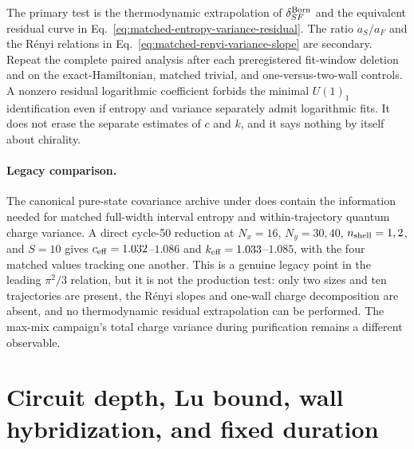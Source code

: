 \documentclass[aps,prx,twocolumn,floatfix,nofootinbib,superscriptaddress,longbibliography]{revtex4-2}
\begin{document}
The primary test is the thermodynamic extrapolation of $\delta_{SF}^{\rm Born}$ and the
equivalent residual curve in Eq.~\eqref{eq:matched-entropy-variance-residual}.  The ratio
$a_S/a_F$ and the R\'enyi relations in Eq.~\eqref{eq:matched-renyi-variance-slope} are
secondary.  Repeat the complete paired analysis after each preregistered fit-window
deletion and on the exact-Hamiltonian, matched trivial, and one-versus-two-wall controls.
A nonzero residual logarithmic coefficient forbids the minimal $U(1)_1$ identification
even if entropy and variance separately admit logarithmic fits.  It does not erase the
separate estimates of $c$ and $k$, and it says nothing by itself about chirality.

\paragraph*{Legacy comparison.}
The canonical pure-state covariance archive under
 does contain
the information needed for matched full-width interval entropy and within-trajectory
quantum charge variance.  A direct cycle-50 reduction at $N_x=16$, $N_y=30,40$,
$n_{\rm shell}=1,2$, and $S=10$ gives $c_{\rm eff}=1.032$--$1.086$ and
$k_{\rm eff}=1.033$--$1.085$, with the four matched values tracking one another.  This is
a genuine legacy point in the leading $\pi^2/3$ relation, but it is not the production
test: only two sizes and ten trajectories are present, the R\'enyi slopes and one-wall
charge decomposition are absent, and no thermodynamic residual extrapolation can be
performed.  The max-mix campaign's total charge variance during purification remains a
different observable.


\section{Circuit depth, Lu bound, wall hybridization, and fixed duration}
\label{app:depth}
\end{document}
